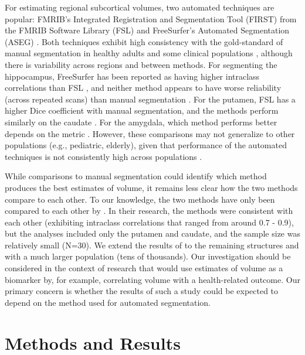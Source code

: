 \documentclass[
  authoryear,
  preprint,
  1p]{elsarticle}
\begin{document}
For estimating regional subcortical volumes, two automated techniques
are popular: FMRIB's Integrated Registration and Segmentation Tool
(FIRST) from the FMRIB Software Library (FSL) and FreeSurfer's Automated
Segmentation (ASEG) \citep{patenaude2007, patenaude2011, fischl2012}.
Both techniques exhibit high consistency with the gold-standard of
manual segmentation in healthy adults and some clinical populations
\citep{hsu2002, tae2008, morey2009, pardoe2009, dewey2010, lehmann2010, doring2011, nugent_automated_2013, wenger_comparing_2014},
although there is variability across regions and between methods. For
segmenting the hippocampus, FreeSurfer has been reported as having
higher intraclass correlations than FSL \citep{doring2011}, and neither
method appears to have worse reliability (across repeated scans) than
manual segmentation \citep{mulder_hippocampal_2014}. For the putamen,
FSL has a higher Dice coefficient with manual segmentation, and the
methods perform similarly on the caudate \citep{perlaki2017}. For the
amygdala, which method performs better depends on the metric
\citep{morey2009}. However, these comparisons may not generalize to
other populations (e.g., pediatric, elderly), given that performance of
the automated techniques is not consistently high across populations
\citep{schoemaker2016, kim2012, sánchez-benavides2010, zhou_charting_2021}.

While comparisons to manual segmentation could identify which method
produces the best estimates of volume, it remains less clear how the two
methods compare to each other. To our knowledge, the two methods have
only been compared to each other by \citet{perlaki2017}. In their
research, the methods were consistent with each other (exhibiting
intraclass correlations that ranged from around 0.7 - 0.9), but the
analyses included only the putamen and caudate, and the sample size was
relatively small (N=30). We extend the results of \citet{perlaki2017} to
the remaining structures and with a much larger population (tens of
thousands). Our investigation should be considered in the context of
research that would use estimates of volume as a biomarker by, for
example, correlating volume with a health-related outcome. Our primary
concern is whether the results of such a study could be expected to
depend on the method used for automated segmentation.

\section{Methods and Results}\label{methods-and-results}
\end{document}

